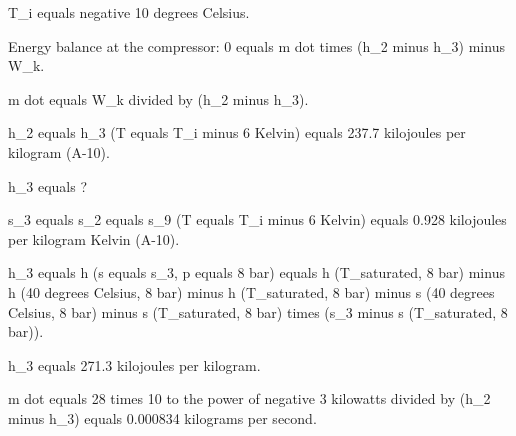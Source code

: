 T_i equals negative 10 degrees Celsius.

Energy balance at the compressor:
0 equals m dot times (h_2 minus h_3) minus W_k.

m dot equals W_k divided by (h_2 minus h_3).

h_2 equals h_3 (T equals T_i minus 6 Kelvin) equals 237.7 kilojoules per kilogram (A-10).

h_3 equals ?

s_3 equals s_2 equals s_9 (T equals T_i minus 6 Kelvin) equals 0.928 kilojoules per kilogram Kelvin (A-10).

h_3 equals h (s equals s_3, p equals 8 bar) equals h (T_saturated, 8 bar) minus h (40 degrees Celsius, 8 bar) minus h (T_saturated, 8 bar) minus s (40 degrees Celsius, 8 bar) minus s (T_saturated, 8 bar) times (s_3 minus s (T_saturated, 8 bar)).

h_3 equals 271.3 kilojoules per kilogram.

m dot equals 28 times 10 to the power of negative 3 kilowatts divided by (h_2 minus h_3) equals 0.000834 kilograms per second.